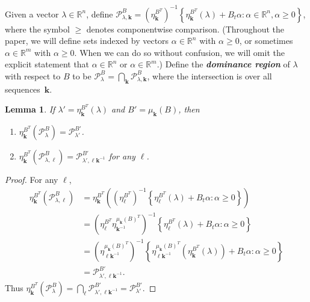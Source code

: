 \documentclass{amsart}
\newtheorem{lemma}[proposition]{Lemma}
\theoremstyle{definition}
\theoremstyle{remark}
\numberwithin{equation}{section}
\newcommand{\newword}[1]{\textbf{\emph{#1}}}
\newcommand{\reals}{\mathbb R}
\newcommand{\set}[1]{{\left\lbrace #1 \right\rbrace}}
\newcommand{\0}{{\mathbf{0}}}
\newcommand{\kk}{\mathbf{k}}
\renewcommand{\ll}{{\boldsymbol\ell}}
\renewcommand{\P}{\mathcal{P}}
\begin{document}
Given a vector $\lambda\in\reals^n$, define $\P^B_{\lambda,\kk}=\left(\eta_{\kk}^{B^T}\right)^{-1}\set{\eta_\kk^{B^T}(\lambda)+B_t\alpha:\alpha\in\reals^n,\alpha\ge0}$, where the symbol $\ge$ denotes componentwise comparison.
(Throughout the paper, we will define sets indexed by vectors $\alpha\in\reals^n$ with $\alpha\ge0$, or sometimes $\alpha\in\reals^m$ with $\alpha\ge0$.
When we can do so without confusion, we will omit the explicit statement that $\alpha\in\reals^n$ or $\alpha\in\reals^m$.)
Define the \newword{dominance region} of $\lambda$ with respect to $B$ to be $\P^B_\lambda=\bigcap_\kk\P^B_{\lambda,\kk}$, where the intersection is over all sequences~$\kk$.
\begin{lemma}\label{shift}
If $\lambda'=\eta^{B^T}_\kk(\lambda)$ and $B'=\mu_\kk(B)$, then 
\begin{enumerate}[\quad\bf1.]
\item \label{shift all}
$\eta^{B^T}_\kk\!\!(\P^B_\lambda)=\P^{B'}_{\lambda'}$.
\item \label{shift one}
$\eta^{B^T}_\kk\!\!(\P^B_{\lambda,\ll})=\P^{B'}_{\lambda',\ll\kk^{-1}}$ for any $\ll$.
\end{enumerate}
\end{lemma}
\begin{proof}
For any $\ll$,
\begin{align*}
\eta^{B^T}_\kk\!\!(\P^B_{\lambda,\ll})
&=\eta^{B^T}_\kk\!\!\left(\left(\eta_{\ll}^{B^T}\right)^{-1}\set{\eta_\ll^{B^T}(\lambda)+B_t\alpha:\alpha\ge0}\right)\\
&=\left(\eta^{B^T}_\ll\!\!\eta_{\kk^{-1}}^{\mu_\kk(B)^T}\right)^{-1}\set{\eta_\ll^{B^T}(\lambda)+B_t\alpha:\alpha\ge0}\\
&=\left(\eta^{\mu_\kk(B)^T}_{\ll\kk^{-1}}\right)^{-1}\set{\eta^{\mu_\kk(B)^T}_{\ll\kk^{-1}}\left(\eta^{B^T}_\kk(\lambda)\right)+B_t\alpha:\alpha\ge0}\\
&=\P^{B'}_{\lambda',\ll\kk^{-1}}.
\end{align*}
Thus $\eta^{B^T}_\kk\!\!(\P^B_\lambda)=\bigcap_\ll\P^{B'}_{\lambda',\ll\kk^{-1}}=\P^{B'}_{\lambda'}$.
\end{proof}
\end{document}

